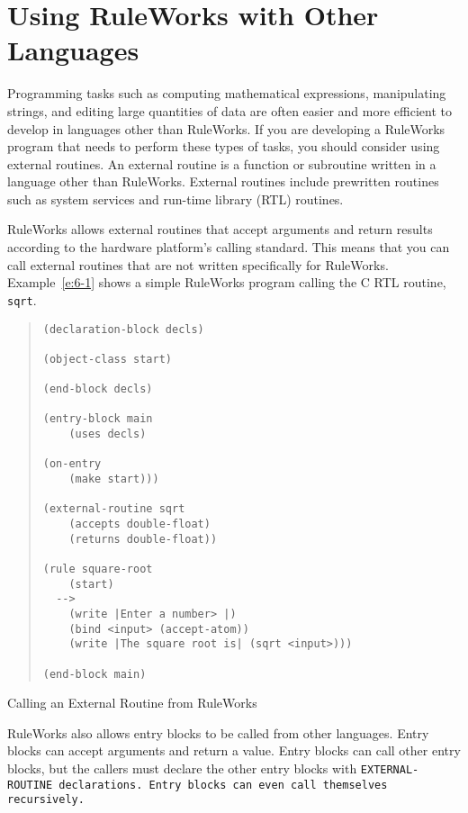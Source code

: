 \chapter{Using RuleWorks with Other Languages}
\label{c:otherlang}

Programming tasks such as computing mathematical expressions,
manipulating strings, and editing large quantities of data are often
easier and more efficient to develop in languages other than
RuleWorks. If you are developing a RuleWorks program that needs to
perform these types of tasks, you should consider using external
routines. An external routine is a function or subroutine written in a
language other than RuleWorks.  External routines include prewritten
routines such as system services and run-time library (RTL) routines.

RuleWorks allows external routines that accept arguments and return
results according to the hardware platform's calling standard. This
means that you can call external routines that are not written
specifically for RuleWorks. Example~\ref{e:6-1} shows a simple
RuleWorks program calling the C RTL routine, \verb|sqrt|.

\begin{example}[h]
\begin{quote}
\begin{verbatim}
(declaration-block decls)

(object-class start)

(end-block decls)

(entry-block main
    (uses decls)

(on-entry
    (make start)))

(external-routine sqrt
    (accepts double-float)
    (returns double-float))

(rule square-root
    (start)
  -->
    (write |Enter a number> |)
    (bind <input> (accept-atom))
    (write |The square root is| (sqrt <input>)))

(end-block main)
\end{verbatim}
\end{quote}
\caption{Calling an External Routine from RuleWorks}
\label{e:6-1}
\end{example}

RuleWorks also allows entry blocks to be called from other
languages. Entry blocks can accept arguments and return a value. Entry
blocks can call other entry blocks, but the callers must declare the
other entry blocks with \tt{EXTERNAL-ROUTINE} declarations. Entry
blocks can even call themselves recursively.

